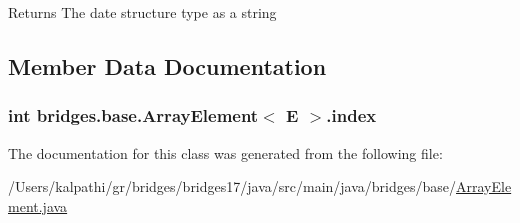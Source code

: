 \begin{DoxyReturn}{Returns}
The date structure type as a string 
\end{DoxyReturn}


\subsection{Member Data Documentation}
\hypertarget{classbridges_1_1base_1_1_array_element_a79c69e5046da8c297026d1e457a23182}{}
\subsubsection[{index}]{\setlength{\rightskip}{0pt plus 5cm}int {\bf bridges.\+base.\+Array\+Element}$<$ E $>$.index\hspace{0.3cm}{\ttfamily [static]}}\label{classbridges_1_1base_1_1_array_element_a79c69e5046da8c297026d1e457a23182}


The documentation for this class was generated from the following file\+:\begin{DoxyCompactItemize}
\item 
/\+Users/kalpathi/gr/bridges/bridges17/java/src/main/java/bridges/base/\hyperlink{_array_element_8java}{Array\+Element.\+java}\end{DoxyCompactItemize}
